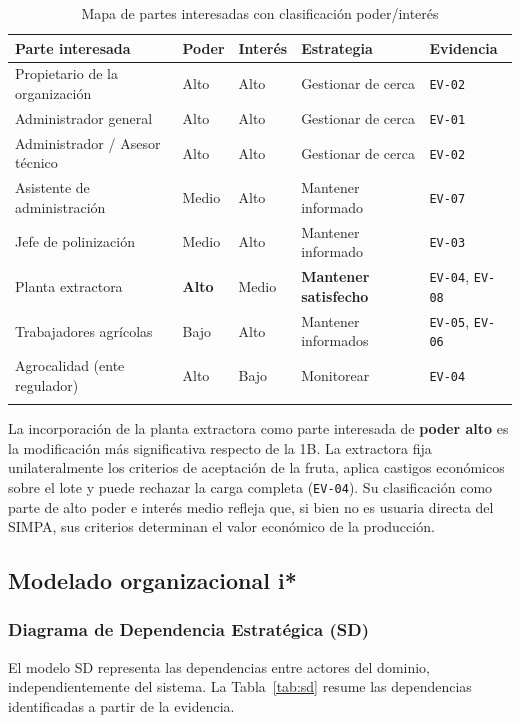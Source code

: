 \documentclass[11pt,a4paper]{article}
\newcommand{\id}[1]{\texttt{\begingroup\hyphenpenalty=10000\relax#1\endgroup}}
\renewcommand{\id}[1]{\texttt{#1}}
\begin{document}
\begin{longtable}{|L{4.2cm}|C{1.8cm}|C{1.8cm}|L{3.4cm}|C{2.2cm}|}
\hline
{}\textbf{Parte interesada} & \textbf{Poder} & \textbf{Interés} & \textbf{Estrategia} & \textbf{Evidencia} \\
\hline
\endhead
Propietario de la organización & Alto & Alto & Gestionar de cerca & \id{EV-02} \\ \hline
Administrador general & Alto & Alto & Gestionar de cerca & \id{EV-01} \\ \hline
Administrador / Asesor técnico & Alto & Alto & Gestionar de cerca & \id{EV-02} \\ \hline
Asistente de administración & Medio & Alto & Mantener informado & \id{EV-07} \\ \hline
Jefe de polinización & Medio & Alto & Mantener informado & \footnotesize \id{EV-03} \\ \hline
Planta extractora & \textbf{Alto} & Medio & \textbf{Mantener satisfecho} & \id{EV-04}, \id{EV-08} \\ \hline
Trabajadores agrícolas & Bajo & Alto & Mantener informados & \id{EV-05}, \id{EV-06} \\ \hline
Agrocalidad (ente regulador) & Alto & Bajo & Monitorear & \footnotesize \id{EV-04} \\ \hline
\caption{Mapa de partes interesadas con clasificación poder/interés}
\end{longtable}

\noindent
La incorporación de la planta extractora como parte interesada de \textbf{poder alto} es la
modificación más significativa respecto de la 1B. La extractora fija unilateralmente los criterios
de aceptación de la fruta, aplica castigos económicos sobre el lote y puede rechazar la carga
completa (\id{EV-04}). Su clasificación como parte de alto poder e interés medio refleja que, si
bien no es usuaria directa del SIMPA, sus criterios determinan el valor económico de la producción.

\subsection{Modelado organizacional i*}

\subsubsection{Diagrama de Dependencia Estratégica (SD)}

El modelo SD representa las dependencias entre actores del dominio, independientemente del sistema.
La Tabla~\ref{tab:sd} resume las dependencias identificadas a partir de la evidencia.
\end{document}
